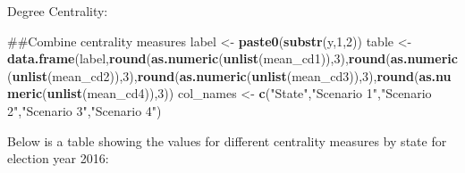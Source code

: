 \documentclass[]{article}
\newenvironment{Shaded}{\begin{snugshade}}{\end{snugshade}}
\newcommand{\KeywordTok}[1]{\textcolor[rgb]{0.13,0.29,0.53}{\textbf{#1}}}
\newcommand{\DataTypeTok}[1]{\textcolor[rgb]{0.13,0.29,0.53}{#1}}
\newcommand{\DecValTok}[1]{\textcolor[rgb]{0.00,0.00,0.81}{#1}}
\newcommand{\StringTok}[1]{\textcolor[rgb]{0.31,0.60,0.02}{#1}}
\newcommand{\OtherTok}[1]{\textcolor[rgb]{0.56,0.35,0.01}{#1}}
\newcommand{\OperatorTok}[1]{\textcolor[rgb]{0.81,0.36,0.00}{\textbf{#1}}}
\newcommand{\NormalTok}[1]{#1}
\begin{document}
Degree Centrality:

\begin{Shaded}
\begin{Highlighting}[]
\NormalTok{##Combine centrality measures}
\NormalTok{label <-}\StringTok{ }\KeywordTok{paste0}\NormalTok{(}\KeywordTok{substr}\NormalTok{(y,}\DecValTok{1}\NormalTok{,}\DecValTok{2}\NormalTok{))}
\NormalTok{table <-}\StringTok{ }\KeywordTok{data.frame}\NormalTok{(label,}\KeywordTok{round}\NormalTok{(}\KeywordTok{as.numeric}\NormalTok{(}\KeywordTok{unlist}\NormalTok{(mean_cd1)),}\DecValTok{3}\NormalTok{),}\KeywordTok{round}\NormalTok{(}\KeywordTok{as.numeric}\NormalTok{(}\KeywordTok{unlist}\NormalTok{(mean_cd2)),}\DecValTok{3}\NormalTok{),}\KeywordTok{round}\NormalTok{(}\KeywordTok{as.numeric}\NormalTok{(}\KeywordTok{unlist}\NormalTok{(mean_cd3)),}\DecValTok{3}\NormalTok{),}\KeywordTok{round}\NormalTok{(}\KeywordTok{as.numeric}\NormalTok{(}\KeywordTok{unlist}\NormalTok{(mean_cd4)),}\DecValTok{3}\NormalTok{))}
\NormalTok{col_names <-}\StringTok{ }\KeywordTok{c}\NormalTok{(}\StringTok{"State"}\NormalTok{,}\StringTok{"Scenario 1"}\NormalTok{,}\StringTok{"Scenario 2"}\NormalTok{,}\StringTok{"Scenario 3"}\NormalTok{,}\StringTok{"Scenario 4"}\NormalTok{)}
\end{Highlighting}
\end{Shaded}

Below is a table showing the values for different centrality measures by
state for election year 2016:

\begin{Shaded}
\end{Shaded}
\end{document}
